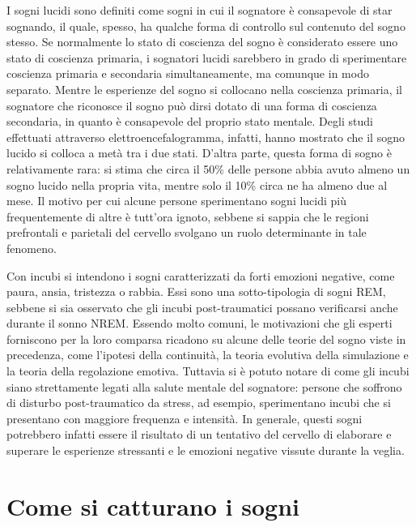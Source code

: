 
I sogni lucidi sono definiti come sogni in cui il sognatore è consapevole di star sognando, il quale, spesso, ha
qualche forma di controllo sul contenuto del sogno stesso.
Se normalmente lo stato di coscienza del sogno è considerato essere uno stato di coscienza primaria,
i sognatori lucidi sarebbero in grado di sperimentare coscienza primaria e secondaria simultaneamente, ma comunque
in modo separato.
Mentre le esperienze del sogno si collocano nella coscienza primaria, il sognatore che
riconosce il sogno può dirsi dotato di una forma di coscienza secondaria, in quanto è consapevole del proprio
stato mentale.
Degli studi effettuati attraverso elettroencefalogramma, infatti, hanno mostrato che il sogno lucido si colloca a metà
tra i due stati. %
D'altra parte, questa forma di sogno è relativamente rara: si stima che circa il 50\% delle persone abbia avuto almeno
un sogno lucido nella propria vita, mentre solo il 10\% circa ne ha almeno due al mese.
Il motivo per cui alcune persone sperimentano sogni lucidi più frequentemente di altre è tutt'ora ignoto, sebbene
si sappia che le regioni prefrontali e parietali del cervello svolgano un ruolo determinante in tale fenomeno.


Con incubi si intendono i sogni caratterizzati da forti emozioni negative, come paura, ansia, tristezza o rabbia.
Essi sono una sotto-tipologia di sogni REM, sebbene si sia osservato che gli incubi post-traumatici possano
verificarsi anche durante il sonno NREM.
Essendo molto comuni, le motivazioni che gli esperti forniscono per la loro comparsa ricadono su alcune delle
teorie del sogno viste in precedenza, come l'ipotesi della continuità, la teoria evolutiva della simulazione e
la teoria della regolazione emotiva.
Tuttavia si è potuto notare di come gli incubi siano strettamente legati alla salute mentale del sognatore: persone
che soffrono di disturbo post-traumatico da stress, ad esempio, sperimentano incubi che si presentano con
maggiore frequenza e intensità.
In generale, questi sogni potrebbero infatti essere il risultato di un tentativo del cervello di elaborare e superare
le esperienze stressanti e le emozioni negative vissute durante la veglia.

\section{Come si catturano i sogni}


